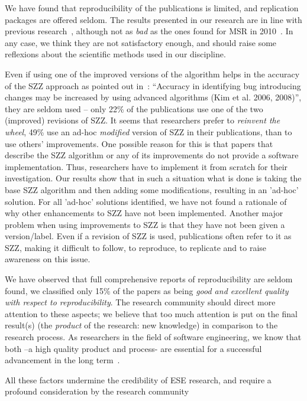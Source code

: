 \documentclass[a4paper, 12pt]{book}
\begin{document}
We have found that reproducibility of the publications is limited, and replication packages are offered seldom. The results presented in our research are in line with previous research~\cite{amann2015software}, although not as \emph{bad} as the ones found for MSR in 2010~\cite{robles2010replicating}. In any case, we think they are not satisfactory enough, and should raise some reflexions about the scientific methods used in our discipline.

Even if using one of the improved versions of the algorithm helps in the accuracy of the SZZ approach as pointed out in~\cite{rahman2012clones}: ``Accuracy in identifying bug introducing changes may be increased by using advanced algorithms (Kim et al. 2006, 2008)'', they are seldom used -- only 22\% of the publications use one of the two (improved) revisions of SZZ. It seems that researchers prefer to \emph{reinvent the wheel}, 49\% use an ad-hoc \emph{modified} version of SZZ in their publications, than to use others' improvements. One possible reason for this is that papers that describe the SZZ algorithm or any of its improvements do not provide a software implementation. Thus, researchers have to implement it from scratch for their investigation. Our results show that in such a situation what is done is taking the base SZZ algorithm and then adding some modifications, resulting in an 'ad-hoc' solution. For all 'ad-hoc' solutions identified, we have not found a rationale of why other enhancements to SZZ have not been implemented. Another major problem when using improvements to SZZ is that they have not been given a version/label. Even if a revision of SZZ is used, publications often refer to it as SZZ, making it difficult to follow, to reproduce, to replicate and to raise awareness on this issue.

We have observed that full comprehensive reports of reproducibility are seldom found, we classified only 15\% of the papers as being \emph{good and excellent quality with respect to reproducibility}. The research community should direct more attention to these aspects; we believe that too much attention is put on the final result(s) (the \emph{product} of the research: new knowledge) in comparison to the research process. As researchers in the field of software engineering, we know that both --a high quality product and process- are essential for a successful advancement in the long term~\cite{kan2002metrics}.

All these factors undermine the credibility of ESE research, and require a profound consideration  by the research community
\end{document}
